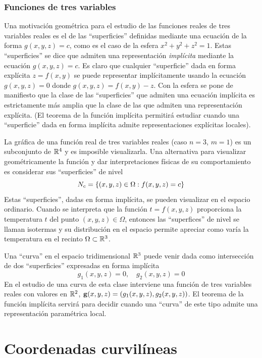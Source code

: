 \subsubsection*{Funciones de tres variables}

Una motivación geométrica para el estudio de las funciones reales de tres variables reales es el de las ``superficies'' definidas mediante una ecuación de la forma $g(x,y,z)=c$, como es el caso de la esfera $x^2+y^2+z^2=1$. Estas ``superficies'' se dice que admiten una representación {\it implícita} mediante la ecuación $g(x,y,z)=c$. Es claro que cualquier ``superficie'' dada en forma explícita $z=f(x,y)$ se puede representar implícitamente usando la ecuación $g(x,y,z)=0$ donde $g(x,y,z)=f(x,y)-z$. Con la esfera se pone de manifiesto que la clase de las ``superficies'' que admiten una ecuación implícita es estrictamente más amplia que la clase de las que admiten una representación explícita. (El teorema de la función implícita permitirá estudiar cuando una ``superficie'' dada en forma implícita admite representaciones explícitas locales).

La gráfica de una función real de tres variables reales (caso $n=3$, $m=1$) es un subconjunto de $\mathbb{R}^4$ y es imposible visualizarla. Una alternativa para visualizar geométricamente la función y dar interpretaciones físicas de su comportamiento es considerar sus ``superficies'' de nivel
$$N_c=\left\lbrace (x,y,z)\in\Omega : f(x,y,z)=c\right\rbrace$$
Estas ``superficies'', dadas en  forma implícita, se pueden visualizar en el espacio ordinario. Cuando se interpreta que la función $t=f(x,y,z)$ proporciona la temperatura $t$ del punto $(x,y,z)\in\Omega$, entonces las ``superfices'' de nivel se llaman isotermas y su distribución en el espacio permite apreciar como varía la temperatura en el recinto $\Omega\subset\mathbb{R}^3$.

Una ``curva'' en el espacio tridimensional $\mathbb{R}^3$ puede venir dada como intersección de dos ``superficies'' expresadas en forma implícita
$$g_1(x,y,z)=0, \quad g_2(x,y,z)=0$$
En el estudio de una curva de esta clase interviene una función de tres variables reales con valores en $\mathbb{R}^2$, $\mathbf{g}(x,y,z)=(g_1(x,y,z), g_2(x,y,z))$. El teorema de la función implícita servirá para decidir cuando una ``curva'' de este tipo admite una representación paramétrica local.

\section{Coordenadas curvilíneas}


